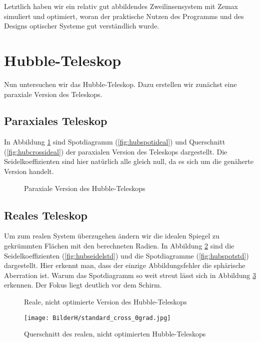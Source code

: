 \documentclass[twoside,colorback,accentcolor=tud4c,11pt]{tudreport}
\begin{document}
	 Letztlich haben wir ein relativ gut abbildendes Zweilinsensystem mit Zemax simuliert und optimiert, woran der praktische Nutzen des Programms und des Designs optischer Systeme gut verständlich wurde.
\section{Hubble-Teleskop}
Nun untersuchen wir das Hubble-Teleskop. Dazu erstellen wir zunächst eine paraxiale Version des Teleskops.
\subsection{Paraxiales Teleskop}
In Abbildung \ref{fig:hubideal} sind Spotdiagramm (\ref{fig:hubspotideal}) und Querschnitt (\ref{fig:hubcrossideal}) der paraxialen Version des Teleskops dargestellt. Die Seidelkoeffizienten sind hier natürlich alle gleich null, da es sich um die genäherte Version handelt.
\begin{figure}[H]
\centering
  \quad
  \quad   
  \caption{Paraxiale Version des Hubble-Teleskops}
  \label{fig:hubideal}
\end{figure}
\subsection{Reales Teleskop}
Um zum realen System überzugehen ändern wir die idealen Spiegel zu gekrümmten Flächen mit den berechneten Radien. In Abbildung \ref{fig:hubstd} sind die Seidelkoeffizienten (\ref{fig:hubseidelstd}) und die Spotdiagramme (\ref{fig:hubspotstd}) dargestellt. Hier erkennt man, dass der einzige Abbildungsfehler die sphärische Aberration ist. Warum das Spotdiagramm so weit streut lässt sich in Abbildung \ref{fig:hubcrossstd} erkennen. Der Fokus liegt deutlich vor dem Schirm.
\begin{figure}[H]
\centering
  \quad
  \quad   
  \caption{Reale, nicht optimierte Version des Hubble-Teleskops}
  \label{fig:hubstd}
  
\end{figure}
\begin{figure}[H]
\centering
   	\begin{minipage}[b]{\textwidth}
   	\texttt{[image: BilderH/standard\_cross\_0grad.jpg]}
   	\caption{Querschnitt des realen, nicht optimierten Hubble-Teleskops}
  	\label{fig:hubcrossstd}
   	\end{minipage}
\end{figure}
\end{document}
